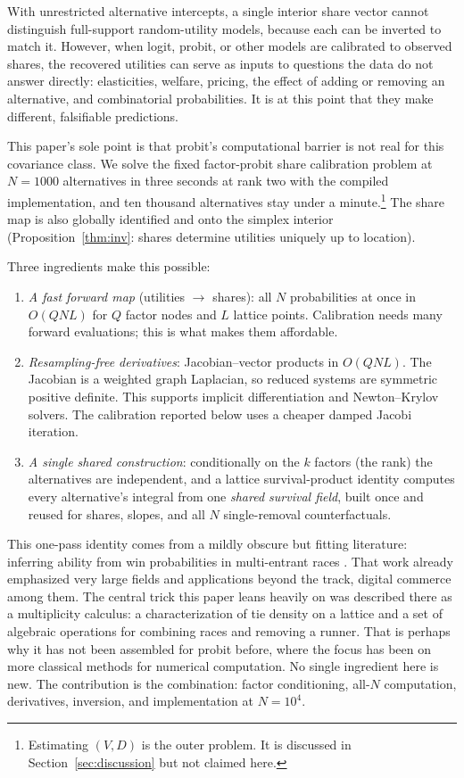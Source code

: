 \documentclass[12pt]{article}
\theoremstyle{remark}
\begin{document}
With unrestricted alternative intercepts, a single interior share
vector cannot distinguish full-support random-utility models, because
each can be inverted to match it. However, when logit, probit, or other
models are calibrated to observed shares, the recovered utilities can
serve as inputs to questions the data do not answer directly:
elasticities, welfare, pricing, the effect of adding or removing an
alternative, and combinatorial probabilities. It is at this point that
they make different, falsifiable predictions.

This paper's sole point is that probit's computational barrier is not
real for this covariance class. We solve the fixed factor-probit share
calibration problem at $N = 1000$ alternatives in three seconds at rank
two with the compiled implementation, and ten thousand alternatives
stay under a minute.\footnote{Estimating $(V, D)$ is the outer problem.
It is discussed in Section~\ref{sec:discussion} but not claimed here.}
The share map is also globally identified and onto the simplex interior
(Proposition~\ref{thm:inv}: shares determine utilities uniquely up to
location).

Three ingredients make this possible: 

\begin{enumerate}
\item \emph{A fast forward map} (utilities $\to$ shares): all $N$
probabilities at once in $O(QNL)$ for $Q$ factor nodes and $L$ lattice
points. Calibration needs many forward evaluations; this is what makes
them affordable.
\item \emph{Resampling-free derivatives}: Jacobian--vector products in
$O(QNL)$. The Jacobian is a weighted graph
Laplacian, so reduced systems are symmetric positive definite. This supports
implicit differentiation and Newton--Krylov solvers. The calibration
reported below uses a cheaper damped Jacobi iteration.
\item \emph{A single shared construction}: conditionally on the $k$
factors (the rank) the alternatives are independent, and a lattice survival-product
identity computes every alternative's integral from one \emph{shared
survival field}, built once and reused for shares, slopes, and all $N$
single-removal counterfactuals.
\end{enumerate}

This one-pass identity comes from a mildly obscure but fitting literature: inferring ability
from win probabilities in multi-entrant races \citep{cotton2021}. That
work already emphasized very large fields and applications beyond the
track, digital commerce among them. The central trick this paper
leans heavily on was described there as a multiplicity calculus: a characterization of tie density 
on a lattice and a set of algebraic operations for combining races and removing a runner. That is
perhaps why it has not been assembled for probit before, where the focus has been on more classical methods
for numerical computation. No single ingredient here is new. The contribution is the
combination: factor conditioning, all-$N$ computation, derivatives,
inversion, and implementation at $N = 10^4$.
\end{document}
